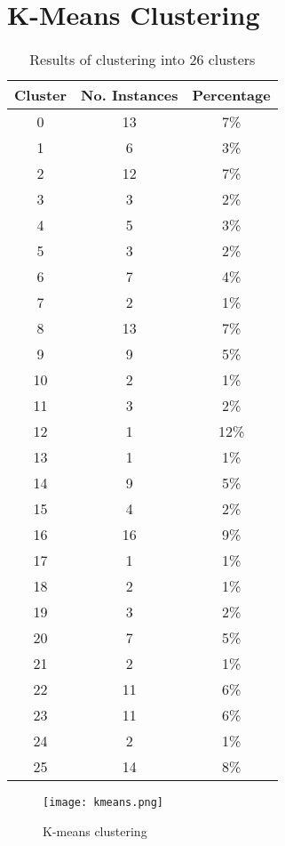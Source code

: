 \documentclass[
11pt, %
a4paper, %
oneside, %
headinclude,footinclude, %
BCOR5mm, %
]{scrartcl}
\begin{document}
\newpage
\section{K-Means Clustering}
\begin{table}[h!]
\centering
\caption{Results of clustering into 26 clusters}
\label{table:kmeans}
	\begin{tabular}{||c c c||} 
		\hline
		Cluster & No. Instances & Percentage \\ [0.5ex] 
		\hline\hline
		0 & 13 & 7\% \\
		1 & 6 & 3\% \\
		2 & 12 & 7\% \\
		3 & 3 & 2\% \\
		4 & 5 & 3\% \\
		5 & 3 & 2\% \\
		6 & 7 & 4\% \\
		7 & 2 & 1\% \\
		8 & 13 & 7\% \\
		9 & 9 & 5\% \\
		10 & 2 & 1\% \\
		11 & 3 & 2\% \\
		12 & 1 & 12\% \\
		13 & 1 & 1\% \\
		14 & 9 & 5\% \\
		15 & 4 & 2\% \\
		16 & 16 & 9\% \\
		17 & 1 & 1\% \\
		18 & 2 & 1\% \\
		19 & 3 & 2\% \\
		20 & 7 & 5\% \\
		21 & 2 & 1\% \\
		22 & 11 & 6\% \\
		23 & 11 & 6\% \\
		24 & 2 & 1\% \\
		25 & 14 & 8\%\\ [1ex] 
		\hline
	\end{tabular}
\end{table}
\newpage
\begin{figure}[h]
	\centering
	\texttt{[image: kmeans.png]}
	\caption{K-means clustering}
	\label{figure:kmeans}
\end{figure}
\end{document}
